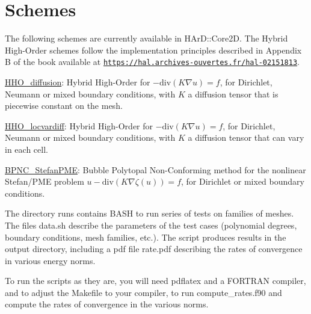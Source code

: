 \label{_schemes}%
 \hypertarget{index_schemes}{}\section{Schemes}\label{index_schemes}
The following schemes are currently available in H\+Ar\+D\+::\+Core2D. The Hybrid High-\/\+Order schemes follow the implementation principles described in Appendix B of the book available at \href{https://hal.archives-ouvertes.fr/hal-02151813}{\tt https\+://hal.\+archives-\/ouvertes.\+fr/hal-\/02151813}.


\begin{DoxyItemize}
\item \hyperlink{classHArDCore2D_1_1HHO__Diffusion}{H\+H\+O\+\_\+diffusion}\+: Hybrid High-\/\+Order for $-\mathrm{div}(K\nabla u)=f$, for Dirichlet, Neumann or mixed boundary conditions, with $K$ a diffusion tensor that is piecewise constant on the mesh.
\item \hyperlink{classHArDCore2D_1_1HHO__LocVarDiff}{H\+H\+O\+\_\+locvardiff}\+: Hybrid High-\/\+Order for $-\mathrm{div}(K\nabla u)=f$, for Dirichlet, Neumann or mixed boundary conditions, with $K$ a diffusion tensor that can vary in each cell.
\item \hyperlink{classHArDCore2D_1_1BPNC__StefanPME}{B\+P\+N\+C\+\_\+\+Stefan\+P\+ME}\+: Bubble Polytopal Non-\/\+Conforming method for the nonlinear Stefan/\+P\+ME problem $u-\mathrm{div}(K\nabla \zeta(u))=f$, for Dirichlet or mixed boundary conditions.
\end{DoxyItemize}

The directory {\ttfamily runs} contains B\+A\+SH to run series of tests on families of meshes. The files {\ttfamily data.\+sh} describe the parameters of the test cases (polynomial degrees, boundary conditions, mesh families, etc.). The script produces results in the {\ttfamily output} directory, including a pdf file {\ttfamily rate.\+pdf} describing the rates of convergence in various energy norms.

To run the scripts as they are, you will need {\ttfamily pdflatex} and a F\+O\+R\+T\+R\+AN compiler, and to adjust the {\ttfamily Makefile} to your compiler, to run {\ttfamily compute\+\_\+rates.\+f90} and compute the rates of convergence in the various norms. 